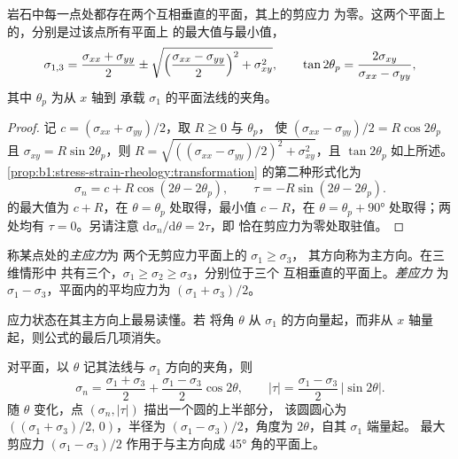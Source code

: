 \begin{theorem}[主应力]\label{thm:b1:stress-strain-rheology:principal}
岩石中每一点处都存在两个互相垂直的平面，其上的剪应力
为零。这两个平面上的，分别是过该点所有平面上
的最大值与最小值，
\[
  \sigma_{1,3} = \frac{\sigma_{xx}+\sigma_{yy}}{2} \pm
  \sqrt{\Bigl(\frac{\sigma_{xx}-\sigma_{yy}}{2}\Bigr)^2 + \sigma_{xy}^2},
  \qquad \tan2\theta_p = \frac{2\sigma_{xy}}{\sigma_{xx}-\sigma_{yy}},
\]
其中 $\theta_p$ 为从 $x$ 轴到
承载 $\sigma_1$ 的平面法线的夹角。
\end{theorem}

\begin{proof}
记 $c = (\sigma_{xx}+\sigma_{yy})/2$，取 $R \ge 0$ 与 $\theta_p$，
使 $(\sigma_{xx}-\sigma_{yy})/2 = R\cos2\theta_p$ 且
$\sigma_{xy} = R\sin2\theta_p$，则
$R = \sqrt{((\sigma_{xx}-\sigma_{yy})/2)^2 + \sigma_{xy}^2}$，且
$\tan2\theta_p$ 如上所述。
\cref{prop:b1:stress-strain-rheology:transformation} 的第二种形式化为
\[
  \sigma_n = c + R\cos(2\theta - 2\theta_p), \qquad \tau = -R\sin(2\theta - 2\theta_p).
\]
的最大值为 $c + R$，在 $\theta = \theta_p$ 处取得，最小值
$c - R$，在 $\theta = \theta_p + \ang{90}$ 处取得；两处均有 $\tau = 0$。另请注意
$\mathrm d\sigma_n/\mathrm d\theta = 2\tau$，即
恰在剪应力为零处取驻值。
\end{proof}

\begin{definition}\label{def:b1:stress-strain-rheology:principal}
称某点处的\emph{主应力}为
两个无剪应力平面上的 $\sigma_1 \ge \sigma_3$，
其方向称为主方向。在三维情形中
共有三个，$\sigma_1 \ge \sigma_2 \ge \sigma_3$，分别位于三个
互相垂直的平面上。\emph{差应力}
 为 $\sigma_1 - \sigma_3$，平面内的平均应力为
$(\sigma_1+\sigma_3)/2$。
\end{definition}

应力状态在其主方向上最易读懂。若
将角 $\theta$ 从 $\sigma_1$ 的方向量起，而非从
$x$ 轴量起，则公式的最后几项消失。

\begin{proposition}[莫尔圆]\label{prop:b1:stress-strain-rheology:mohr}
对平面，以 $\theta$ 记其法线与
$\sigma_1$ 方向的夹角，则
\[
  \sigma_n = \frac{\sigma_1+\sigma_3}{2} + \frac{\sigma_1-\sigma_3}{2}\cos2\theta,
  \qquad
  |\tau| = \frac{\sigma_1-\sigma_3}{2}\,|\sin2\theta| .
\]
随 $\theta$ 变化，点 $(\sigma_n, |\tau|)$ 描出一个圆的上半部分，
该圆圆心为 $((\sigma_1+\sigma_3)/2,\, 0)$，半径为
$(\sigma_1-\sigma_3)/2$，角度为 $2\theta$，自其 $\sigma_1$ 端量起。
最大剪应力 $(\sigma_1-\sigma_3)/2$ 作用于与主方向成
\ang{45} 角的平面上。
\end{proposition}

